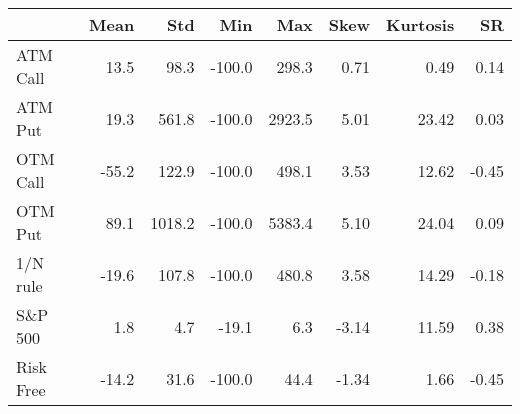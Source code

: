 \begin{tabular}{lrrrrrrr}
\hline
           &   Mean &    Std &    Min &    Max &   Skew &   Kurtosis &    SR \\
\hline
 ATM Call  &   13.5 &   98.3 & -100.0 &  298.3 &   0.71 &       0.49 &  0.14 \\
 ATM Put   &   19.3 &  561.8 & -100.0 & 2923.5 &   5.01 &      23.42 &  0.03 \\
 OTM Call  &  -55.2 &  122.9 & -100.0 &  498.1 &   3.53 &      12.62 & -0.45 \\
 OTM Put   &   89.1 & 1018.2 & -100.0 & 5383.4 &   5.10 &      24.04 &  0.09 \\
 1/N rule  &  -19.6 &  107.8 & -100.0 &  480.8 &   3.58 &      14.29 & -0.18 \\
 S\&P 500   &    1.8 &    4.7 &  -19.1 &    6.3 &  -3.14 &      11.59 &  0.38 \\
 Risk Free &  -14.2 &   31.6 & -100.0 &   44.4 &  -1.34 &       1.66 & -0.45 \\
\hline
\end{tabular}